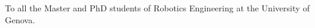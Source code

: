 
\begin{dedication}

To all the Master and PhD students of Robotics Engineering at the University of Genova.

\end{dedication}

